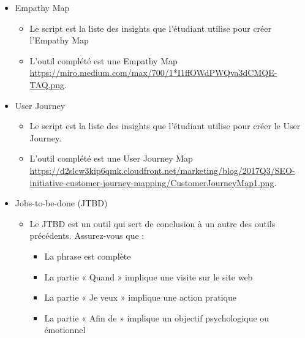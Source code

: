 \begin{itemize}
\item Empathy Map
\begin{itemize}
\item Le script est la liste des insights que l'étudiant utilise pour créer l'Empathy Map
\item L'outil complété est une Empathy Map \url{https://miro.medium.com/max/700/1*I1ffOWdPWQva3dCMQE-TAQ.png}.
\end{itemize}
\end{itemize}

\begin{itemize}
\item User Journey
\begin{itemize}
\item Le script est la liste des insights que l'étudiant utilise pour créer le User Journey.
\item L'outil complété est une User Journey Map \url{https://d2slcw3kip6qmk.cloudfront.net/marketing/blog/2017Q3/SEO-initiative-customer-journey-mapping/CustomerJourneyMap1.png}.
\end{itemize}
\end{itemize}

\begin{itemize}
\item Jobs-to-be-done (JTBD)
\begin{itemize}
\item Le JTBD est un outil qui sert de conclusion à un autre des outils précédents. Assurez-vous que :
\begin{itemize}
\item La phrase est complète
\item La partie « Quand » implique une visite sur le site web
\item La partie « Je veux » implique une action pratique
\item La partie « Afin de » implique un objectif psychologique ou émotionnel
\end{itemize}
\end{itemize}
\end{itemize}

